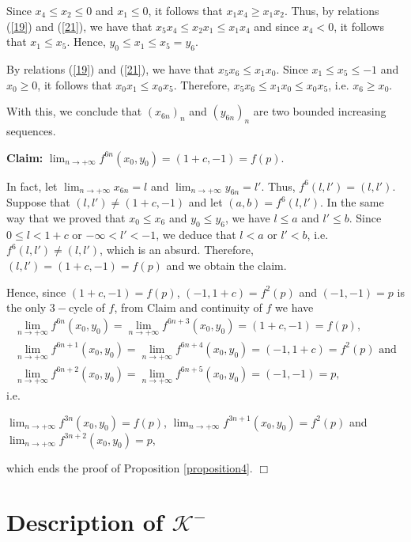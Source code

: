 \documentclass[11pt]{amsart}
\theoremstyle{definition}
\begin{document}
	Since $x_4\leq x_2\leq 0$ and $x_1\leq 0$, it follows that $x_1x_4\geq x_1x_2$. Thus, by relations (\ref{19}) and (\ref{21}), we have that $x_5x_4\leq x_2x_1\leq x_1x_4$ and since $x_4<0$, it follows that $x_1\leq x_5$. Hence, $y_0\leq x_1\leq x_5=y_6$.
	
	By relations (\ref{19}) and (\ref{21}), we have that $x_5x_6\leq x_1x_0$. Since $x_1\leq x_5\leq -1$ and $x_0\geq 0$, it follows that $x_0x_1\leq x_0x_5$. Therefore, $x_5x_6\leq x_1x_0\leq x_0x_5$, i.e. $x_6\geq x_0$.
	
With this, we conclude that $(x_{6n})_n$ and $(y_{6n})_n$ are two bounded increasing sequences.
	
	\noindent \textbf{Claim:} $\displaystyle\lim_{n\to+\infty}f^{6n}(x_0,y_0)=(1+c,-1)=f(p)$.
	
	\noindent In fact, let $\lim_{n\to+\infty} x_{6n}=l$ and $\lim_{n\to+\infty} y_{6n}= l'$. Thus, $f^6(l,l')=(l,l')$. Suppose that $(l,l')\neq (1+c,-1)$ and let $(a,b)=f^6(l,l')$. In the same way that we proved that $x_0\leq x_6$ and $y_0\leq y_6$, we have $l\leq a$ and $l'\leq b$. Since $0\leq l<1+c$ or $-\infty<l'<-1$, we deduce that $l<a$ or $l'<b$, i.e. $f^6(l,l')\neq (l,l')$, which is an absurd. Therefore, $(l,l')= (1+c,-1)=f(p)$ and we obtain the claim.

Hence, since $(1+c,-1)=f(p)$, $(-1,1+c)=f^2(p)$ and $(-1,-1)=p$ is the only $3-$cycle of $f$, from Claim and continuity of $f$ we have
$$
\begin{array}{l}
\displaystyle\lim_{n\to+\infty}f^{6n}(x_0,y_0)=\lim_{n\to+\infty}f^{6n+3}(x_0,y_0)=(1+c,-1)=f(p), \\
\displaystyle\lim_{n\to+\infty}f^{6n+1}(x_0,y_0)=\lim_{n\to+\infty}f^{6n+4}(x_0,y_0)=(-1,1+c)=f^2(p) \textrm{ and} \\
\displaystyle\lim_{n\to+\infty}f^{6n+2}(x_0,y_0)=\lim_{n\to+\infty}f^{6n+5}(x_0,y_0)=(-1,-1)=p,
\end{array}
$$
i.e.

\begin{center}
$\displaystyle\lim_{n\to+\infty}f^{3n}(x_0,y_0)=f(p)$,
$\displaystyle\lim_{n\to+\infty}f^{3n+1}(x_0,y_0)=f^2(p)$ and
$\displaystyle\lim_{n\to+\infty}f^{3n+2}(x_0,y_0)=p$,
\end{center}
which ends the proof of Proposition \ref{proposition4}. \hfill $\Box$

\section{Description of $\mathcal{K}^-$}
\label{secaokmenos}
\end{document}
